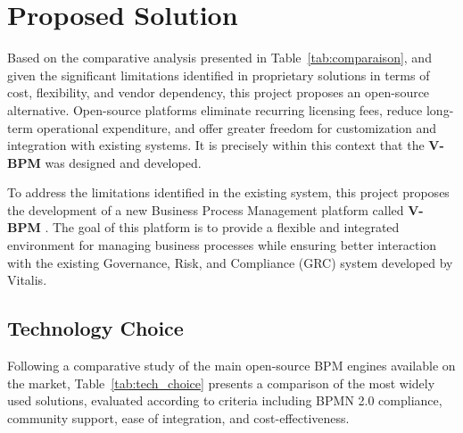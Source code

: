 \section{Proposed Solution}

Based on the comparative analysis presented in Table~\ref{tab:comparaison}, and given the significant limitations identified in proprietary solutions in terms of cost, flexibility, and vendor dependency, this project proposes an open-source alternative. Open-source platforms eliminate recurring licensing fees, reduce long-term operational expenditure, and offer greater freedom for customization and integration with existing systems. It is precisely within this context that the \textbf{V-BPM} was designed and developed.

To address the limitations identified in the existing system, this project proposes the development of a new Business Process Management platform called \textbf{V-BPM  }. The goal of this platform is to provide a flexible and integrated environment for managing business processes while ensuring better interaction with the existing Governance, Risk, and Compliance (GRC) system developed by Vitalis.

\subsection{Technology Choice}

Following a comparative study of the main open-source BPM engines available 
on the market, Table~\ref{tab:tech_choice} presents a comparison of the most 
widely used solutions, evaluated according to criteria including BPMN 2.0 
compliance, community support, ease of integration, and cost-effectiveness.

